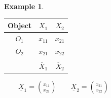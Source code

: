 \documentclass[11pt,a4paper]{article}
\theoremstyle{definition}
\newtheorem{exa}[thm]{Example}
\begin{document}
\begin{exa}


\begin{table}[H]
\begin{tabular}{c|cc}
Object & $X_1$ & $X_2$\\
\hline
$O_1$ & $x_{11}$ & $x_{21}$\\
$O_2$ & $x_{21}$ & $x_{22}$\\
\hline
&&\\
 & $\overline{X}_1$ & $\overline{X}_2$\\
\end{tabular}
\end{table}
\end{exa}

$\qquad  \displaystyle{\underline{X}_1=\binom{x_{11}}{x_{21}}}\qquad  \underline{X}_2=\displaystyle{\binom{x_{21}}{x_{22}}}$
\end{document}
